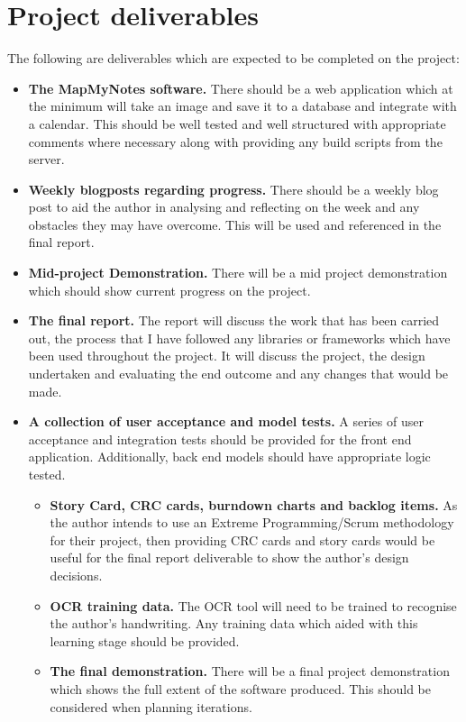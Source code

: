 \documentclass[11pt,fleqn,twoside]{article}
\begin{document}
\section{Project deliverables}
The following are deliverables which are expected to be completed on the project:
\begin{itemize}

  \item \textbf{The MapMyNotes software.} There should be a web application which at the minimum will take an image and save it to a database and integrate with a calendar. This should be well tested and well structured with appropriate comments where necessary along with providing any build scripts from the server.

  \item \textbf{Weekly blogposts regarding progress.} There should be a weekly blog post to aid the author in analysing and reflecting on the week and any obstacles they may have overcome. This will be used and referenced in the final report.

  \item \textbf{Mid-project Demonstration.} There will be a mid project demonstration which should show current progress on the project.

  \item \textbf{The final report.} The report will discuss the work that has been carried out, the process that I have followed any libraries or frameworks which have been used throughout the project. It will discuss the project, the design undertaken and evaluating the end outcome and any changes that would be made.
  \item \textbf{A collection of user acceptance and model tests.} A series of user acceptance and integration tests should be provided for the front end application. Additionally, back end models should have appropriate logic tested.
    \begin{itemize}

      \item \textbf{Story Card, CRC cards, burndown charts and backlog items.} As the author intends to use an Extreme Programming/Scrum methodology for their project, then providing CRC cards and story cards would be useful for the final report deliverable to show the author's design decisions.

      \item \textbf{OCR training data.} The OCR tool will need to be trained to recognise the author's handwriting. Any training data which aided with this learning stage should be provided.

      \item \textbf{The final demonstration.} There will be a final project demonstration which shows the full extent of the software produced. This should be considered when planning iterations.
    \end{itemize}

\end{itemize}
\end{document}
